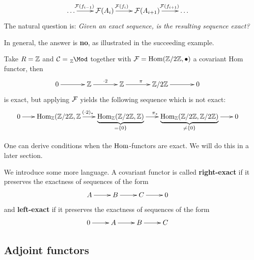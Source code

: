 \documentclass[twoside = false,	%
		headsepline,		%
		parskip = true,
		]{scrbook}						%
\begin{document}
        \begin{equation*}
            \xymatrix {
                \dots \ar^(.4){\cF(f_{i-1})}[r] & \cF(A_i)\ar^(.4){\cF(f_i)}[r] & \cF(A_{i+1})\ar^(.6){\cF(f_{i+1})}[r] & \dots
            }
        \end{equation*}
        The natural question is: \textit{Given an exact sequence, is the resulting sequence exact?}
        
        In general, the answer is \textbf{no}, as illustrated in the succeeding example.

        \begin{example*}{}
            Take $R=\mathbb Z$ and $\cC = \tensor[_\Z]{\Mod}{^{}}$ together with $\mathcal F = \mathrm{Hom}(\mathbb Z/2\mathbb Z,\bullet)$ a covariant Hom functor, then
            \begin{equation*}
                \xymatrix @C=35pt {
                    0 \ar[r] & \Z \ar[r]^{\cdot 2} & \Z \ar[r]^{\pi} & \Z/2 \Z \ar[r] & 0
                }
            \end{equation*}
            is exact, but applying $\mathcal F$ yields the following sequence which is not exact:
            \begin{equation*}
                \xymatrix @C=18pt {
                    0 \ar[r] & \Hom_\Z(\Z/2\Z,\Z \ar[r]^(.47){(\cdot 2)_*} & {\underbrace{\Hom_\Z(\Z/2\Z,\Z)}_{=\{0\}}} \ar[r]^{\pi_*} & {\underbrace{\Hom_\Z(\Z/2 \Z,\Z/2\Z)}_{ \neq\{0\}}} \ar[r] & 0
                }
            \end{equation*}
        \end{example*}
        One can derive conditions when the $\mathrm{Hom}$-functors are exact. We will do this in a later section.

        We introduce some more language. A covariant functor is called \textbf{right-exact} if it preserves the exactness of sequences of the form
        \begin{equation*}
            \xymatrix {
                A \ar[r] & B \ar[r] & C \ar[r] & 0
            }
        \end{equation*}
        and \textbf{left-exact} if it preserves the exactness of sequences of the form
        \begin{equation*}
            \xymatrix {
                 0 \ar[r] & A \ar[r] & B \ar[r] & C
            }
        \end{equation*}
        
    \subsection{Adjoint functors}
    
\end{document}
